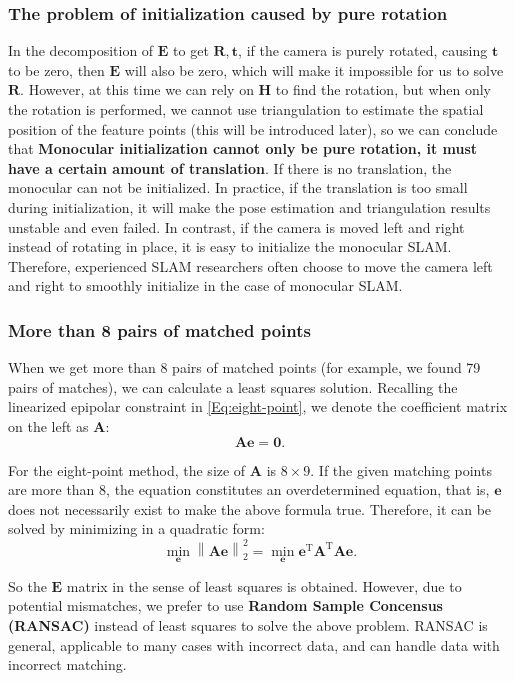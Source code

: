 \subsubsection{The problem of initialization caused by pure rotation}
In the decomposition of $\bm{E}$ to get $\bm{R}, \bm{t}$, if the camera is purely rotated, causing $\bm{t}$ to be zero, then $\bm{E}$ will also be zero, which will make it impossible for us to solve $\bm{R}$. However, at this time we can rely on $\bm{H}$ to find the rotation, but when only the rotation is performed, we cannot use triangulation to estimate the spatial position of the feature points (this will be introduced later), so we can conclude that \textbf{Monocular initialization cannot only be pure rotation, it must have a certain amount of translation}. If there is no translation, the monocular can not be initialized. In practice, if the translation is too small during initialization, it will make the pose estimation and triangulation results unstable and even failed. In contrast, if the camera is moved left and right instead of rotating in place, it is easy to initialize the monocular SLAM. Therefore, experienced SLAM researchers often choose to move the camera left and right to smoothly initialize in the case of monocular SLAM.

\subsubsection{More than 8 pairs of matched points}
When we get more than 8 pairs of matched points (for example, we found 79 pairs of matches), we can calculate a least squares solution. Recalling the linearized epipolar constraint in \eqref{Eq:eight-point}, we denote the coefficient matrix on the left as $\bm{A}$:
\begin{equation}
\bm{A} \bm{e} = \bm{0} .
\end{equation}

For the eight-point method, the size of $\bm{A}$ is $8 \times 9$. If the given matching points are more than $8$, the equation constitutes an overdetermined equation, that is, $\bm{e}$ does not necessarily exist to make the above formula true. Therefore, it can be solved by minimizing in a quadratic form:
\begin{equation}
\mathop {\min }\limits_{\bm{e}} \left\| \bm{Ae} \right\|_2^2 = \mathop {\min }\limits_{\bm{e}} { \bm{e}^\mathrm{T}} {\bm{A}^\mathrm{T}} \bm{Ae}.
\end{equation}

So the $\bm{E}$ matrix in the sense of least squares is obtained. However, due to potential mismatches, we prefer to use \textbf{Random Sample Concensus (RANSAC)} instead of least squares to solve the above problem. RANSAC is general, applicable to many cases with incorrect data, and can handle data with incorrect matching.

